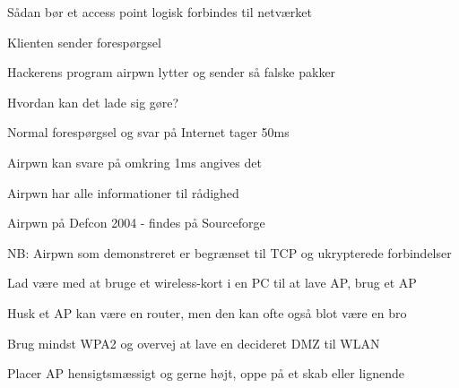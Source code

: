 \documentclass[Screen16to9,17pt]{foils}
\begin{document}

\centerline{\hlkbig Sådan bør et access point logisk forbindes til netværket}








\begin{list1}
\item Klienten sender forespørgsel
\item Hackerens program airpwn lytter og sender så falske pakker
\item Hvordan kan det lade sig gøre?
\begin{list2}
\item Normal forespørgsel og svar på Internet tager 50ms
\item Airpwn kan svare på omkring 1ms angives det
\item Airpwn har alle informationer til rådighed
\end{list2}
\item Airpwn på Defcon 2004 - findes på Sourceforge\\
\item NB: Airpwn som demonstreret er begrænset til TCP og ukrypterede
  forbindelser
\end{list1}



\begin{list1}
\item Lad være med at bruge et wireless-kort i en PC til at lave AP, brug et AP
\item Husk et AP kan være en router, men den kan ofte også blot være en bro
\item Brug mindst WPA2 og overvej at lave en decideret DMZ til WLAN
\item Placer AP hensigtsmæssigt og gerne højt, oppe på et skab eller lignende
\end{list1}

\end{document}
